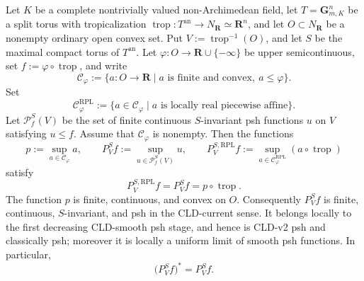\begin{proposition}
\label{prop:p033-invariant-toric-real-pl-envelope}
Let $K$ be a complete nontrivially valued non-Archimedean field, let
$T=\mathbf G_{m,K}^n$ be a split torus with tropicalization
\(\operatorname{trop}:T^{\mathrm{an}}\to N_{\mathbf R}\simeq\mathbf R^n\), and let
\(O\subset N_{\mathbf R}\) be a nonempty ordinary open convex set.  Put
\(V:=\operatorname{trop}^{-1}(O)\), and let $S$ be the maximal compact torus
of $T^{\mathrm{an}}$.  Let
\(\varphi:O\to\mathbf R\cup\{-\infty\}\) be upper semicontinuous, set
\(f:=\varphi\circ\operatorname{trop}\), and write
\[
 \mathcal C_\varphi
 :=\{a:O\to\mathbf R\mid a\text{ is finite and convex},\ a\leq\varphi\}.
\]
Set
\[
 \mathcal C_\varphi^{\mathrm{RPL}}
 :=\{a\in\mathcal C_\varphi\mid a\text{ is locally real piecewise affine}\}.
\]
Let \(\mathcal P^S_f(V)\) be the set of finite continuous \(S\)-invariant
psh functions \(u\) on \(V\) satisfying \(u\leq f\).  Assume that
\(\mathcal C_\varphi\) is nonempty.  Then the functions
\[
 p:=\sup_{a\in\mathcal C_\varphi}a,
 \qquad
 P^S_Vf:=\sup_{u\in\mathcal P^S_f(V)}u,
 \qquad
 P^{S,\mathrm{RPL}}_V f
 :=\sup_{a\in\mathcal C_\varphi^{\mathrm{RPL}}}
        (a\circ\operatorname{trop})
\]
satisfy
\[
 P^{S,\mathrm{RPL}}_V f=P^S_Vf=p\circ\operatorname{trop}.
\]
The function $p$ is finite, continuous, and convex on $O$.  Consequently
\(P^S_Vf\) is finite, continuous, \(S\)-invariant, and psh in the
CLD-current sense.  It belongs locally to the first decreasing CLD-smooth
psh stage, and hence is CLD-v2 psh and classically psh; moreover it is locally a
uniform limit of smooth psh functions.  In particular,
\[
 \bigl(P^S_Vf\bigr)^*=P^S_Vf.
\]
\end{proposition}

